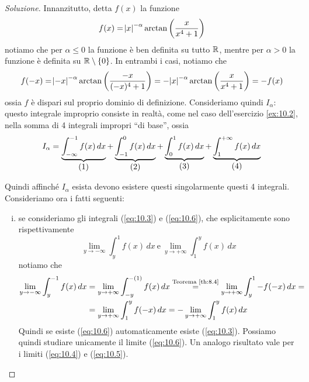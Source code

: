 \begin{proof}[Soluzione]
    Innanzitutto, detta $f(x)$ la funzione 
    \[
    f(x) = \abs{x}^{-\alpha}\arctan\left(\frac{x}{x^4+1}\right)
    \]
    notiamo che per $\alpha\le 0$ la funzione è ben definita su tutto $\amsbb{R}$, mentre per $\alpha>0$ la funzione è definita su $\amsbb{R}\setminus\{0\}$. In entrambi i casi, notiamo che 
    \[
    f(-x) = \abs{-x}^{-\alpha}\arctan\left(\frac{-x}{(-x)^4+1}\right) = -\abs{x}^{-\alpha} \arctan\left(\frac{x}{x^4+1}\right) = -f(x)
    \]
    ossia $f$ è dispari sul proprio dominio di definizione. Consideriamo quindi $I_\alpha$: questo integrale improprio consiste in realtà, come nel caso dell'esercizio \ref{ex:10.2}, nella somma di 4 integrali impropri ``di base'', ossia
    \[
    I_\alpha =  \underbrace{\int_{-\infty}^{-1} f(x)\, dx}_{\stepcounter{equation}\mbox{(\theequation)}} + \underbrace{\int_{-1}^0 f(x)\, dx}_{\stepcounter{equation}\mbox{(\theequation)}} + \underbrace{\int_0^1 f(x)\, dx}_{\stepcounter{equation}\mbox{(\theequation)}} + \underbrace{\int_1^{+\infty} f(x)\, dx}_{\stepcounter{equation}\mbox{(\theequation)}}
    \]
    \addtocounter{equation}{-4}\label{eq:10.3}
    \addtocounter{equation}{0}\label{eq:10.4}
    \addtocounter{equation}{0}\label{eq:10.5}
    \addtocounter{equation}{0}\label{eq:10.6}
    Quindi affinché $I_\alpha$ esista devono esistere questi singolarmente questi 4 integrali. Consideriamo ora i fatti seguenti:
    \begin{enumerate}[(i)]
        \item se consideriamo gli integrali (\ref{eq:10.3}) e (\ref{eq:10.6}), che esplicitamente sono rispettivamente
        \[
        \lim_{y\to-\infty} \int_y^1 f(x)\, dx \ \text{e} \ \lim_{y\to +\infty} \int_1^y f(x)\, dx
        \]
        notiamo che
        \[
        \begin{split}
            \lim_{y\to-\infty} \int_{y}^{-1} f(x)\, dx &= \lim_{y\to+\infty} \int_{-y}^{-(1)} f(x)\, dx \overset{\text{Teorema \ref{th:8.4}}}{=} \lim_{y\to +\infty} \int_y^{1} -f(-x)\, dx = \\
            & = \lim_{y\to+\infty} \int_1^y f(-x)\, dx = -\lim_{y\to+\infty} \int_1^y f(x)\, dx
        \end{split}
        \]
        Quindi se esiste (\ref{eq:10.6}) automaticamente esiste (\ref{eq:10.3}). Possiamo quindi studiare unicamente il limite (\ref{eq:10.6}). Un analogo risultato vale per i limiti (\ref{eq:10.4}) e (\ref{eq:10.5}).

\end{enumerate}
\end{proof}
